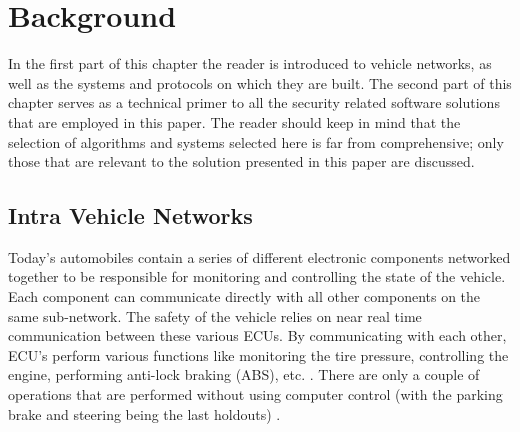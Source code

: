 
\chapter{Background}
\label{chap:background}

In the first part of this chapter the reader is introduced to vehicle networks, as well as the systems and protocols on which they are built. The second part of this chapter serves as a technical primer to all the security related software solutions that are employed in this paper. The reader should keep in mind that the selection of algorithms and systems selected here is far from comprehensive; only those that are relevant to the solution presented in this paper are discussed.   

\section{Intra Vehicle Networks}
\label{sec:vni}
Today's automobiles contain a series of different electronic components networked together to be responsible for monitoring and controlling the state of the vehicle. Each component can communicate directly with all other components on the same sub-network. The safety of the vehicle relies on near real time communication between these various ECUs. By communicating with each other, ECU's perform various functions like monitoring the tire pressure, controlling the engine, performing anti-lock braking (ABS), etc. \cite{Yadav16}. There are only a couple of operations that are performed without using computer control (with the parking brake and steering being the last holdouts) \cite{Kosher}. 

